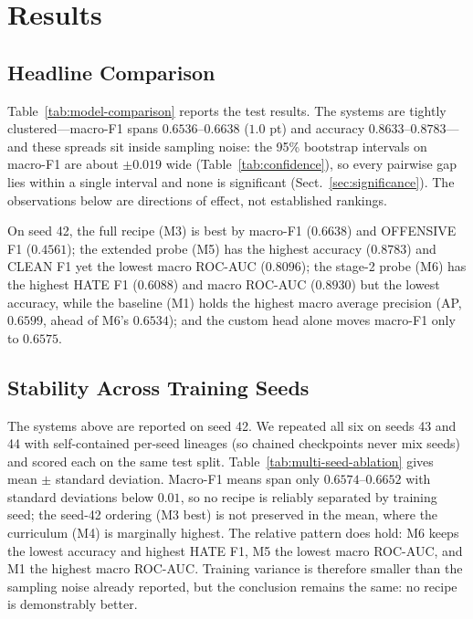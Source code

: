 \section{Results}
\label{sec:results}

\subsection{Headline Comparison}
Table~\ref{tab:model-comparison} reports the test results.  The systems are
tightly clustered---macro-F1 spans $0.6536$--$0.6638$ ($1.0$ pt) and accuracy
$0.8633$--$0.8783$---and these spreads sit inside sampling noise: the 95\% bootstrap
intervals on macro-F1 are about $\pm0.019$ wide (Table~\ref{tab:confidence}), so
every pairwise gap lies within a single interval and none is significant
(Sect.~\ref{sec:significance}).  The observations below are directions of effect,
not established rankings.



On seed 42, the full recipe (M3) is best by macro-F1 ($\mathbf{0.6638}$) and
OFFENSIVE F1 ($0.4561$); the extended probe (M5) has the highest accuracy
($\mathbf{0.8783}$)
and CLEAN F1 yet the lowest macro ROC-AUC ($0.8096$); the stage-2 probe (M6) has
the highest HATE F1 ($\mathbf{0.6088}$) and macro ROC-AUC ($\mathbf{0.8930}$) but
the lowest accuracy, while the baseline (M1) holds the highest macro average
precision (AP, $0.6599$, ahead of M6's $0.6534$); and the custom head alone moves
macro-F1 only to $0.6575$.

\subsection{Stability Across Training Seeds}
\label{sec:multi-seed}
The systems above are reported on seed 42.  We repeated all six on seeds 43 and
44 with self-contained per-seed lineages (so chained checkpoints never mix seeds)
and scored each on the same test split.  Table~\ref{tab:multi-seed-ablation}
gives mean $\pm$ standard deviation.  Macro-F1 means span only
$0.6574$--$0.6652$ with standard deviations below $0.01$, so no recipe is
reliably separated by training seed; the seed-42 ordering (M3 best) is not
preserved in the mean, where the curriculum (M4) is marginally highest.  The
relative pattern does hold: M6 keeps the lowest accuracy and highest HATE F1,
M5 the lowest macro ROC-AUC, and M1 the highest macro ROC-AUC.  Training variance
is therefore smaller than the sampling noise already reported, but the conclusion
remains the same: no recipe is demonstrably better.

